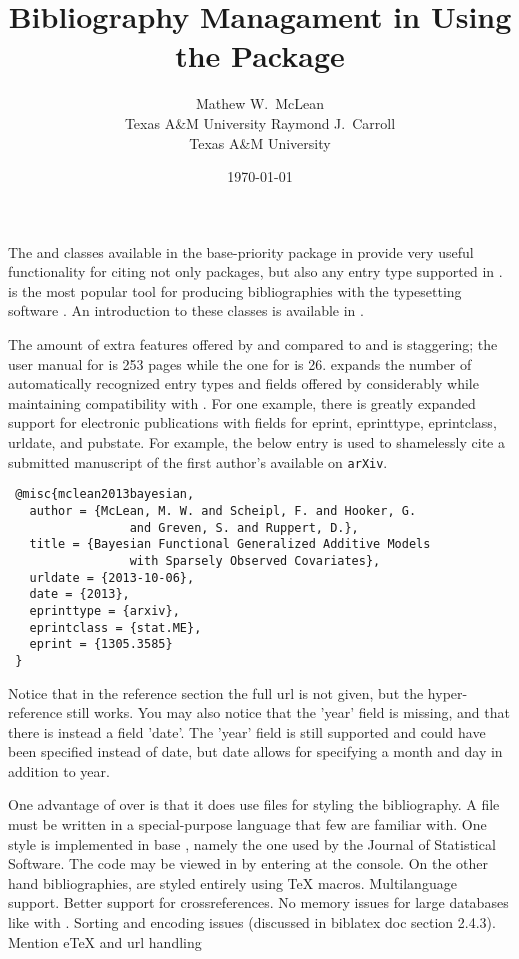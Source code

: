 \documentclass[article]{jss}\usepackage[]{graphicx}\usepackage[]{color}
\title{\Biblatex{} Bibliography Managament in \R{} Using the \ourpkg{} Package}
\author{Mathew W.\ McLean\\ Texas A\&M University
\And
Raymond J.\ Carroll\\
Texas A\&M University
}
\date{\today}
\begin{document}
\maketitle

The  and  classes available in the base-priority  package in \R{} provide very useful functionality for citing not only \R{} packages, but also any entry type supported in \Bibtex.  \Bibtex{} \citep{bibtex} is the most popular tool for producing bibliographies with the typesetting software \proglang{\TeX}.  An introduction to these classes is available in \citet{hornik2012who}.


The amount of extra features offered by \Biblatex{} and \biber{} compared to \natbib{} and \Bibtex{} is staggering; the user manual for \Biblatex{} is 253 pages while the one for \natbib{} is 26.  \Biblatex{} expands the number of automatically recognized entry types and fields offered by \Bibtex{} considerably while maintaining compatibility with \Bibtex{}.  For one example, there is greatly expanded support for electronic publications with fields for eprint, eprinttype, eprintclass, urldate, and pubstate.  For example, the below entry is used to shamelessly cite a submitted manuscript of the first author's available on \texttt{arXiv}. 




 \begin{verbatim}
 @misc{mclean2013bayesian,
   author = {McLean, M. W. and Scheipl, F. and Hooker, G.
                 and Greven, S. and Ruppert, D.},
   title = {Bayesian Functional Generalized Additive Models 
                 with Sparsely Observed Covariates},
   urldate = {2013-10-06},
   date = {2013},
   eprinttype = {arxiv},
   eprintclass = {stat.ME},
   eprint = {1305.3585}
 }
 \end{verbatim}

Notice that in the reference section the full url is not given, but the hyper-reference still works.  You may also notice that the 'year' field is missing, and that there is instead a field 'date'.  The 'year' field is still supported and could have been specified instead of date, but date allows for specifying a month and day in addition to year.

One advantage of \Biblatex{} over \Bibtex{} is that it does use \bst{} files for styling the bibliography. A \bst{} file must be written in a special-purpose language that few are familiar with.  One style is implemented in base , namely the one used by the Journal of Statistical Software.  The code may be viewed in  by entering  at the console.  On the other hand \Biblatex{} bibliographies, are styled entirely using \TeX{} macros.  Multilanguage support.  Better support for crossreferences.  No memory issues for large databases like with \Bibtex{}.  Sorting and encoding issues (discussed in biblatex doc section 2.4.3). Mention eTeX and url handling
\end{document}

